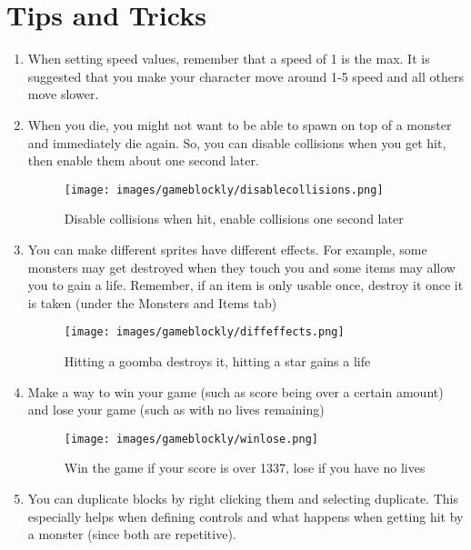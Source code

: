 \documentclass{article}
\begin{document}
\section{Tips and Tricks}
\begin{enumerate}
    \item When setting speed values, remember that a speed of 1 is the max.  It is suggested that you make your character move around 1-5 speed and all others move slower.
    \item When you die, you might not want to be able to spawn on top of a monster and immediately die again.  So, you can disable collisions when you get hit, then enable them about one second later.

\begin{figure}[h!]
    {\centering
    \texttt{[image: images/gameblockly/disablecollisions.png]}
    \caption{Disable collisions when hit, enable collisions one second later}
    }
\end{figure}

    \item You can make different sprites have different effects.  For example, some monsters may get destroyed when they touch you and some items may allow you to gain a life.  Remember, if an item is only usable once, destroy it once it is taken (under the Monsters and Items tab)

\begin{figure}[h!]
    {\centering
    \texttt{[image: images/gameblockly/diffeffects.png]}
    \caption{Hitting a goomba destroys it, hitting a star gains a life}
    }
\end{figure}
    \item Make a way to win your game (such as score being over a certain amount) and lose your game (such as with no lives remaining)
\begin{figure}[h!]
    {\centering
    \texttt{[image: images/gameblockly/winlose.png]}
    \caption{Win the game if your score is over 1337, lose if you have no lives}
    }
\end{figure}
    \item You can duplicate blocks by right clicking them and selecting duplicate.  This especially helps when defining controls and what happens when getting hit by a monster (since both are repetitive).
\end{enumerate}
\end{document}
